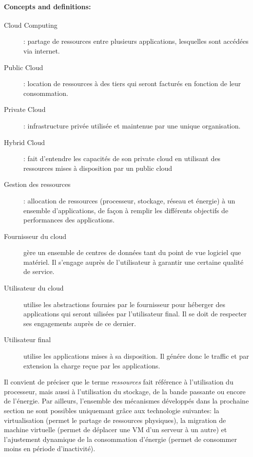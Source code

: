 \documentclass[11pt]{article}
\begin{document}
\paragraph{Concepts and definitions:}
\begin{description}
	\item[Cloud Computing] : partage de ressources entre plusieurs applications, lesquelles sont accédées via internet.
	\item[Public Cloud] : location de ressources à des tiers qui seront facturés en fonction de leur consommation.
	\item[Private Cloud] : infrastructure privée utilisée et maintenue par une unique organisation.
	\item[Hybrid Cloud] : fait d'entendre les capacités de son private cloud en utilisant des ressources mises à disposition par un public cloud
	\item[Gestion des ressources] : allocation de ressources (processeur, stockage, réseau et énergie) à un ensemble d'applications, de façon à remplir les différents 
		objectifs de performances des applications.
	\item[Fournisseur du cloud] gère un ensemble de centres de données tant du point de vue logiciel que matériel. Il s'engage auprès de l'utilisateur à garantir une
		certaine qualité de service.
	\item[Utilisateur du cloud] utilise les abstractions fournies par le fournisseur pour héberger des applications qui seront uilisées par l'utilisateur final. Il 
		se doit de respecter ses engagements auprès de ce dernier.
	\item[Utilisateur final] utilise les applications mises à sa disposition. Il génére donc le traffic et par extension la charge reçue par les applications.
\end{description}
Il convient de préciser que le terme \textit{ressources} fait référence à l'utilisation du processeur, mais aussi à l'utilisation du stockage, de la bande passante ou
encore de l'énergie. Par ailleurs, l'ensemble des mécanismes développés dans la prochaine section ne sont possibles uniquemant grâce aux technologie suivantes: 
la virtualisation (permet le partage de ressources physiques), la migration de machine virtuelle (permet de déplacer une VM d'un serveur à un autre) et l'ajustement 
dynamique de la consommation d'énergie (permet de consommer moins en période d'inactivité).
\end{document}
